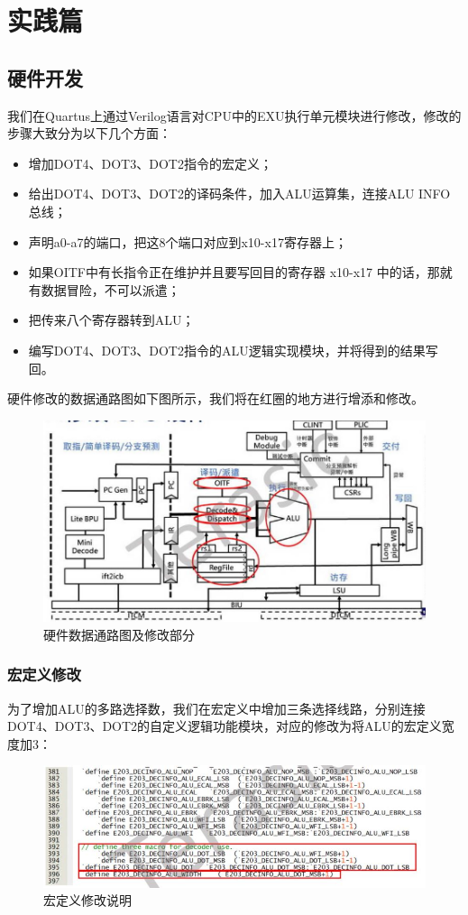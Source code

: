 \documentclass[a4paper, 14pt, oneside]{book} %
\numberwithin{equation}{subsection}
\begin{document}
	\section{实践篇}
	\subsection{硬件开发}
	我们在Quartus上通过Verilog语言对CPU中的EXU执行单元模块进行修改，修改的步骤大致分为以下几个方面：
	\begin{itemize}
		\item 增加DOT4、DOT3、DOT2指令的宏定义；
		\item 给出DOT4、DOT3、DOT2的译码条件，加入ALU运算集，连接ALU INFO总线；
		\item 声明a0-a7的端口，把这8个端口对应到x10-x17寄存器上；
		\item 如果OITF中有长指令正在维护并且要写回目的寄存器 x10-x17 中的话，那就有数据冒险，不可以派遣；
		\item 把传来八个寄存器转到ALU；
		\item 编写DOT4、DOT3、DOT2指令的ALU逻辑实现模块，并将得到的结果写回。
	\end{itemize}
	硬件修改的数据通路图如下图所示，我们将在红圈的地方进行增添和修改。
	\begin{figure}[H]
		\centering
		\includegraphics[scale=0.8]{img/datalink.jpg}
		\caption{硬件数据通路图及修改部分}
	\end{figure}
	\subsubsection{宏定义修改}
	为了增加ALU的多路选择数，我们在宏定义中增加三条选择线路，分别连接DOT4、DOT3、DOT2的自定义逻辑功能模块，对应的修改为将ALU的宏定义宽度加3：
	\begin{figure}[H]
		\centering
		\includegraphics[scale=1]{img/define.jpg}
		\caption{宏定义修改说明}
	\end{figure}
	
\end{document}

